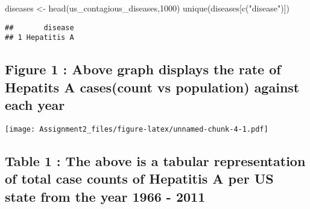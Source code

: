 \documentclass[
]{article}
\newenvironment{Shaded}{\begin{snugshade}}{\end{snugshade}}
\newcommand{\DecValTok}[1]{\textcolor[rgb]{0.00,0.00,0.81}{#1}}
\newcommand{\FunctionTok}[1]{\textcolor[rgb]{0.00,0.00,0.00}{#1}}
\newcommand{\NormalTok}[1]{#1}
\newcommand{\OtherTok}[1]{\textcolor[rgb]{0.56,0.35,0.01}{#1}}
\newcommand{\StringTok}[1]{\textcolor[rgb]{0.31,0.60,0.02}{#1}}
\begin{document}
\begin{Shaded}
\begin{Highlighting}[]
\NormalTok{diseases }\OtherTok{\textless{}{-}} \FunctionTok{head}\NormalTok{(us\_contagious\_diseases,}\DecValTok{1000}\NormalTok{)}
\FunctionTok{unique}\NormalTok{(diseases[}\FunctionTok{c}\NormalTok{(}\StringTok{"disease"}\NormalTok{)])}
\end{Highlighting}
\end{Shaded}

\begin{verbatim}
##       disease
## 1 Hepatitis A
\end{verbatim}

\hypertarget{figure-1-above-graph-displays-the-rate-of-hepatits-a-casescount-vs-population-against-each-year}{%
\subsection{Figure 1 : Above graph displays the rate of Hepatits A
cases(count vs population) against each
year}\label{figure-1-above-graph-displays-the-rate-of-hepatits-a-casescount-vs-population-against-each-year}}

\texttt{[image: Assignment2\_files/figure-latex/unnamed-chunk-4-1.pdf]}

\hypertarget{table-1-the-above-is-a-tabular-representation-of-total-case-counts-of-hepatitis-a-per-us-state-from-the-year-1966---2011}{%
\subsection{Table 1 : The above is a tabular representation of total
case counts of Hepatitis A per US state from the year 1966 -
2011}\label{table-1-the-above-is-a-tabular-representation-of-total-case-counts-of-hepatitis-a-per-us-state-from-the-year-1966---2011}}
\end{document}
